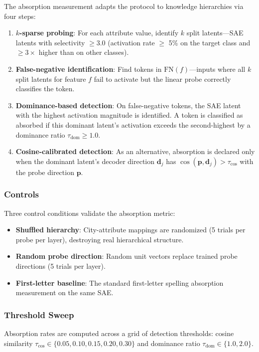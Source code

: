 \documentclass{article}
\begin{document}
The absorption measurement adapts the \citet{chanin2024absorption} protocol to knowledge hierarchies via four steps:
\begin{enumerate}
\item \textbf{$k$-sparse probing}: For each attribute value, identify $k$ split latents---SAE latents with selectivity $\geq 3.0$ (activation rate $\geq$ 5\% on the target class and $\geq 3\times$ higher than on other classes).
\item \textbf{False-negative identification}: Find tokens in $\text{FN}(f)$---inputs where all $k$ split latents for feature $f$ fail to activate but the linear probe correctly classifies the token.
\item \textbf{Dominance-based detection}: On false-negative tokens, the SAE latent with the highest activation magnitude is identified. A token is classified as absorbed if this dominant latent's activation exceeds the second-highest by a dominance ratio $\tau_{\text{dom}} \geq 1.0$.
\item \textbf{Cosine-calibrated detection}: As an alternative, absorption is declared only when the dominant latent's decoder direction $\mathbf{d}_j$ has $\cos(\mathbf{p}, \mathbf{d}_j) > \tau_{\text{cos}}$ with the probe direction $\mathbf{p}$.
\end{enumerate}

\subsubsection{Controls}

Three control conditions validate the absorption metric:
\begin{itemize}
\item \textbf{Shuffled hierarchy}: City-attribute mappings are randomized (5 trials per probe per layer), destroying real hierarchical structure.
\item \textbf{Random probe direction}: Random unit vectors replace trained probe directions (5 trials per layer).
\item \textbf{First-letter baseline}: The standard \citet{chanin2024absorption} first-letter spelling absorption measurement on the same SAE.
\end{itemize}

\subsubsection{Threshold Sweep}

Absorption rates are computed across a grid of detection thresholds: cosine similarity $\tau_{\text{cos}} \in \{0.05, 0.10, 0.15, 0.20, 0.30\}$ and dominance ratio $\tau_{\text{dom}} \in \{1.0, 2.0\}$.
\end{document}
